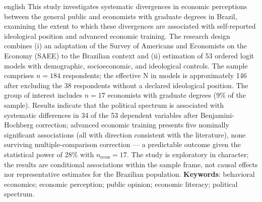
\begin{resumo}[Abstract]
 \begin{otherlanguage*}{english}
  This study investigates systematic divergences in economic perceptions between the general public and economists with graduate degrees in Brazil, examining the extent to which these divergences are associated with self-reported ideological position and advanced economic training. The research design combines (i) an adaptation of the Survey of Americans and Economists on the Economy (SAEE) to the Brazilian context and (ii) estimation of 53 ordered logit models with demographic, socioeconomic, and ideological controls. The sample comprises $n = 184$ respondents; the effective N in models is approximately 146 after excluding the 38 respondents without a declared ideological position. The group of interest includes $n = 17$ economists with graduate degrees (9\% of the sample). Results indicate that the political spectrum is associated with systematic differences in 34 of the 53 dependent variables after Benjamini-Hochberg correction; advanced economic training presents five nominally significant associations (all with direction consistent with the literature), none surviving multiple-comparison correction --- a predictable outcome given the statistical power of 28\% with $n_{\text{econ}} = 17$. The study is exploratory in character; the results are conditional associations within the sample frame, not causal effects nor representative estimates for the Brazilian population.
   \textbf{Keywords}: behavioral economics; economic perception; public opinion; economic literacy; political spectrum.
 \end{otherlanguage*}
\end{resumo}
